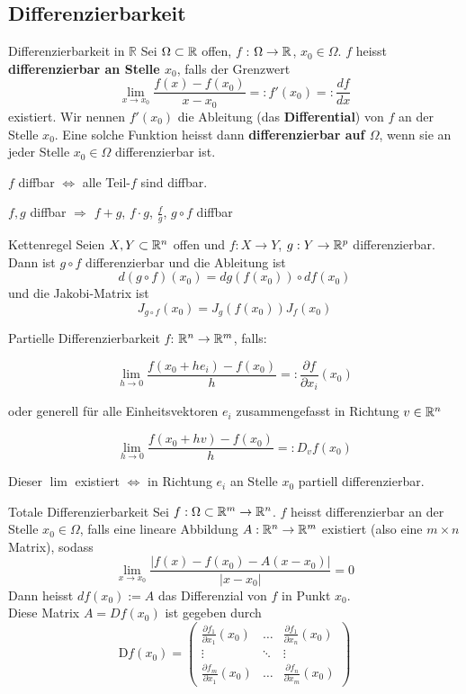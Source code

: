 \subsection{Differenzierbarkeit}

\begin{Definition}{Differenzierbarkeit in $ \mathbb{R} $}{}
    Sei $\Omega \subset \mathbb{R}$ offen, $f$ : $\Omega \to \mathbb{R}$, $x_0\in\Omega$. $f$ heisst \textbf{differenzierbar an Stelle $x_0$}, falls der Grenzwert
    \[
    \lim_{x \rightarrow x_0} \frac{f(x) - f(x_0)}{x - x_0} =:
    f'(x_0) =:
    \frac{df}{dx}
    \]
    existiert. Wir nennen $f'(x_0)$ die Ableitung (das \textbf{Differential}) von $f$ an der Stelle $x_0$. Eine solche Funktion heisst dann \textbf{differenzierbar auf $\Omega$}, wenn sie an jeder Stelle $x_0 \in \Omega$ differenzierbar ist.
\end{Definition}
$f$ diffbar $\Leftrightarrow$ alle Teil-$f$ sind diffbar.

$f,g$ diffbar $\Rightarrow$ $f+g$, $f \cdot g$, $\frac{f}{g}$, $g \circ f$ diffbar
\begin{Satz}{Kettenregel}{}
	Seien $X,Y \subset \mathbb{R}^n$ offen und $f: X \to Y$, $g: Y \to \mathbb{R}^p$ differenzierbar. Dann ist $g \circ f$ differenzierbar und die Ableitung ist \[d(g\circ f)(x_0) = dg(f(x_0))\circ df(x_0)\] und die Jakobi-Matrix ist \[J_{g\circ f}(x_0) = J_g(f(x_0))J_f(x_0)\]
\end{Satz}
\begin{Definition}{Partielle Differenzierbarkeit}{}
	$f$: $\mathbb{R}^n \rightarrow \mathbb{R}^m$, falls:

	\[
    	\lim_{h \rightarrow 0} \frac{f(x_0 + h e_i)-f(x_0)}{h} =: \frac{\partial f}{\partial x_i}(x_0)
	\]

	oder generell für alle Einheitsvektoren $e_i$ zusammengefasst in Richtung $v \in \mathbb{R}^n$

	\[
    	\lim_{h \rightarrow 0} \frac{f(x_0 + h v)-f(x_0)}{h} =: D_v f(x_0)
	\]

	Dieser $\lim$ existiert $\Leftrightarrow$ in Richtung $e_i$ an Stelle $x_0$ partiell differenzierbar.
\end{Definition}
\begin{Definition}{Totale Differenzierbarkeit}{}
	Sei $f: \Omega \subset \mathbb{R}^m \to \mathbb{R}^n$. $f$ heisst differenzierbar an der Stelle $x_0 \in \Omega$, falls eine lineare Abbildung $A: \mathbb{R}^n \to \mathbb{R}^m$ existiert (also eine $m \times n$ Matrix), sodass \[\lim_{x \to x_0} \frac{|f(x) - f(x_0) - A(x - x_0)|}{|x - x_0|} = 0\] Dann heisst $df(x_0) := A$ das Differenzial von $f$ in Punkt $x_0$. \\
	Diese Matrix $A = Df(x_0)$ ist gegeben durch
	\[
		\text{D}f(x_0) =
        \begin{pmatrix}
            \frac{\partial f_1}{\partial x_1}(x_0)&\hdots&\frac{\partial f_1}{\partial x_n}(x_0)\\
            \vdots&\ddots&\vdots\\
            \frac{\partial f_m}{\partial x_1}(x_0)&\hdots&\frac{\partial f_n}{\partial x_m}(x_0)
        \end{pmatrix}
    \]
\end{Definition}
